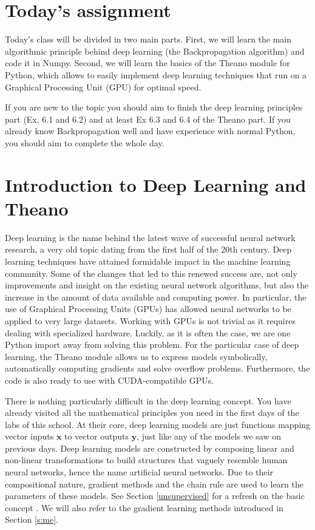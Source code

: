 \section{Today's assignment}
Today's class will be divided in two main parts. First, we will learn the main 
algorithmic principle behind deep learning (the Backpropagation algorithm) and code it in Numpy. Second, we will learn the basics of the Theano module for Python, 
which allows to easily implement deep learning techniques that run on a 
Graphical Processing Unit (GPU) for optimal speed. 

If you are new to the topic you should aim to finish the deep learning 
principles part (Ex. 6.1 and 6.2) and at least Ex 6.3 and 6.4 of the Theano 
part. If you already know Backpropagation well and have experience with normal 
Python, you should aim to complete the whole day. 

\section{Introduction to Deep Learning and Theano}

Deep learning is the name behind the latest wave of successful neural network 
research, a very old topic dating from the first half of the 20th century. Deep 
learning techniques have attained formidable impact in the machine learning 
community. 
Some of the changes that led to this renewed success are, not only
improvements and insight on the existing neural network algorithms, but also
the increase in the amount of data available and computing power. In
particular, the use of Graphical Processing Units (GPUs) has allowed neural
networks to be applied to very large datasets. Working with GPUs is not trivial
as it requires dealing with specialized hardware. Luckily, as it is often the
case, we are one Python import away from solving this problem. For the
particular case of deep learning, the
Theano\footnotemark{}
module allows us to express models symbolically, automatically computing
gradients and solve overflow problems. Furthermore, the code is also ready to
use with CUDA-compatible GPUs.

There is nothing particularly difficult in the deep learning concept. You have
already visited all the mathematical principles you need in the first days of the
labs of this school. At their core, deep learning models are just functions
mapping vector inputs $\mathbf{x}$ to vector outputs $\mathbf{y}$, just like any
of the models we saw on previous days. Deep learning models are constructed by
composing linear and non-linear transformations to build structures that vaguely
resemble human neural networks, hence the name artificial neural networks. Due
to their compositional nature, gradient methods and the chain rule are used to
learn the parameters of these models. See Section \ref{unsupervised} for a
refresh on the basic concept . We will also refer to the gradient
learning methods introduced in Section \ref{s:me}.

